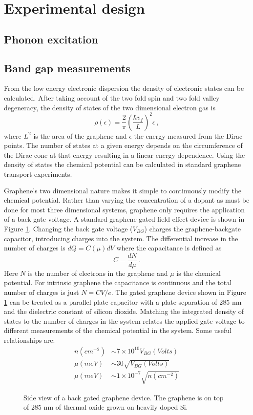 \section{Experimental design}
\subsection{Phonon excitation}

\subsection{Band gap measurements}
From the low energy electronic dispersion the density of electronic states can be calculated.
After taking account of the two fold spin and two fold valley degeneracy, the density of states of the two dimensional electron gas is
\begin{equation*}
	\rho(\epsilon)=\frac{2}{\pi} \left( \frac{\hbar v_f}{L} \right)^2 \epsilon \ ,
\end{equation*}
where $L^2$ is the area of the graphene and $\epsilon$ the energy measured from the Dirac points.
The number of states at a given energy depends on the circumference of the Dirac cone at that energy resulting in a linear energy dependence.
Using the density of states the chemical potential can be calculated in standard graphene transport experiments.

Graphene's two dimensional nature makes it simple to continuously modify the chemical potential.
Rather than varying the concentration of a dopant as must be done for most three dimensional systems, graphene only requires the application of a back gate voltage.
A standard graphene gated field effect device is shown in Figure \ref{fig:kek:FET}.
Changing the back gate voltage ($V_{BG}$) charges the graphene-backgate capacitor, introducing charges into the system.
The differential increase in the number of charges is $dQ=C(\mu) dV$ where the capacitance is defined as
\begin{equation*}
	C=\frac{d N}{d \mu} \ .
\end{equation*}
Here $N$ is the number of electrons in the graphene and $\mu$ is the chemical potential.
For intrinsic graphene the capacitance is continuous and the total number of charges is just $N=CV/e$.
The gated graphene device shown in Figure \ref{fig:kek:FET} can be treated as a parallel plate capacitor with a plate separation of 285 nm and the dielectric constant of silicon dioxide.
Matching the integrated density of states to the number of charges in the system relates the applied gate voltage to different measurements of the chemical potential in the system.
Some useful relationships are:
\begin{align*}
	n(cm^{-2})&\sim 7 \times 10^{10} V_{BG} (Volts) \\
	\mu(meV) &\sim 30 \sqrt{V_{BG} (Volts)} \\
	\mu(meV) &\sim 1 \times 10^{-7} \sqrt{n(cm^{-2})}
\end{align*}

\begin{figure}
	\begin{center}
	
	\end{center}
	\caption[Side view of a back gated graphene device.]{\label{fig:kek:FET} Side view of a back gated graphene device.  The graphene is on top of 285 nm of thermal oxide grown on heavily doped Si. }	
\end{figure}

